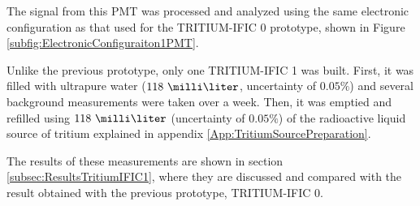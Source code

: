 The signal from this PMT was processed and analyzed using the same electronic configuration as that used for the TRITIUM-IFIC 0 prototype, shown in Figure \ref{subfig:ElectronicConfiguraiton1PMT}.

Unlike the previous prototype, only one TRITIUM-IFIC 1 was built. First, it was filled with ultrapure water ($118~\milli\liter$, uncertainty of $0.05\%$) and several background measurements were taken over a week. Then, it was emptied and refilled using $118~\milli\liter$ (uncertainty of $0.05\%$) of the radioactive liquid source of tritium explained in appendix \ref{App:TritiumSourcePreparation}.

The results of these measurements are shown in section \ref{subsec:ResultsTritiumIFIC1}, where they are discussed and compared with the result obtained with the previous prototype, TRITIUM-IFIC 0.